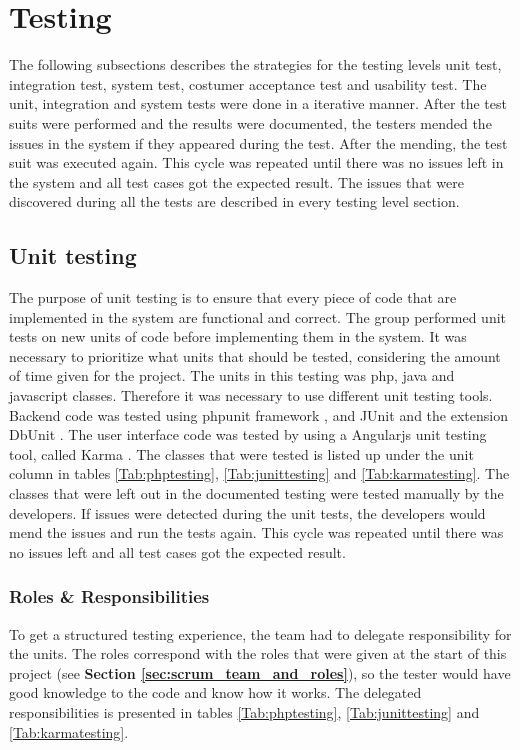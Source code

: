 \chapter{Testing}
\label{chap:testing}

The following subsections describes the strategies for the testing levels unit test, integration test, system test, costumer acceptance test and usability test. 
The unit, integration and system tests were done in a iterative manner. After the test suits were performed and the results were documented, the testers mended the issues in the system if they appeared during the test. After the mending, the test suit was executed again. This cycle was repeated until there was no issues left in the system and all test cases got the expected result. 
The issues that were discovered during all the tests are described in every testing level section. 


\section{Unit testing}
\label{sec:unit_testing}
The purpose of unit testing is to ensure that every piece of code that are implemented in the system are functional and correct. The group performed unit tests on new units of code before implementing them in the system. It was necessary to prioritize what units that should be tested, considering the amount of time given for the project. 
The units in this testing was php, java and javascript classes. Therefore it was necessary to use different unit testing tools. Backend code was tested using phpunit framework \cite{KF2}, and JUnit \cite{KF5} and the extension DbUnit \cite{KF6}. The user interface code was tested by using a Angularjs unit testing tool, called Karma \cite{KF3}. 
The classes that were tested is listed up under the unit column in tables  \ref{Tab:phptesting}, \ref{Tab:junittesting} and \ref{Tab:karmatesting}. The classes that were left out in the documented testing were tested manually by the developers. If issues were detected during the unit tests, the developers would mend the issues and run the tests again. This cycle was repeated until there was no issues left and all test cases got the expected result.\newline

\subsection{Roles \& Responsibilities}
To get a structured testing experience, the team had to delegate responsibility for the units. The roles correspond with the roles that were given at the start of this project (see \textbf{Section \ref{sec:scrum_team_and_roles}}), so the tester would have good knowledge to the code and know how it works. The delegated responsibilities is presented in tables  \ref{Tab:phptesting}, \ref{Tab:junittesting} and \ref{Tab:karmatesting}.




